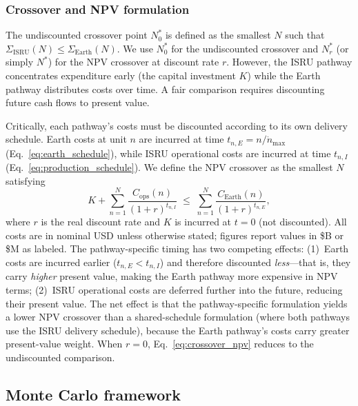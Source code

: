 \documentclass[preprint,12pt]{elsarticle}
\begin{document}
\subsubsection{Crossover and NPV formulation}

The undiscounted crossover point $N^*_0$ is defined as the smallest $N$ such that $\Sigma_{\mathrm{ISRU}}(N) \leq \Sigma_{\mathrm{Earth}}(N)$. We use $N^*_0$ for the undiscounted crossover and $N^*_r$ (or simply $N^*$) for the NPV crossover at discount rate $r$. However, the ISRU pathway concentrates expenditure early (the capital investment $K$) while the Earth pathway distributes costs over time. A fair comparison requires discounting future cash flows to present value.

Critically, each pathway's costs must be discounted according to its own delivery schedule. Earth costs at unit $n$ are incurred at time $t_{n,E} = n/\dot{n}_{\max}$ (Eq.~\ref{eq:earth_schedule}), while ISRU operational costs are incurred at time $t_{n,I}$ (Eq.~\ref{eq:production_schedule}). We define the NPV crossover as the smallest $N$ satisfying
\begin{equation}
  K + \sum_{n=1}^{N} \frac{C_{\mathrm{ops}}(n)}{(1+r)^{t_{n,I}}} \;\leq\; \sum_{n=1}^{N} \frac{C_{\mathrm{Earth}}(n)}{(1+r)^{t_{n,E}}},
  \label{eq:crossover_npv}
\end{equation}
where $r$ is the real discount rate and $K$ is incurred at $t = 0$ (not discounted). All costs are in nominal USD unless otherwise stated; figures report values in \$B or \$M as labeled. The pathway-specific timing has two competing effects: (1)~Earth costs are incurred earlier ($t_{n,E} < t_{n,I}$) and therefore discounted \emph{less}---that is, they carry \emph{higher} present value, making the Earth pathway more expensive in NPV terms; (2)~ISRU operational costs are deferred further into the future, reducing their present value. The net effect is that the pathway-specific formulation yields a lower NPV crossover than a shared-schedule formulation (where both pathways use the ISRU delivery schedule), because the Earth pathway's costs carry greater present-value weight. When $r = 0$, Eq.~\ref{eq:crossover_npv} reduces to the undiscounted comparison.

\subsection{Monte Carlo framework}
\end{document}
